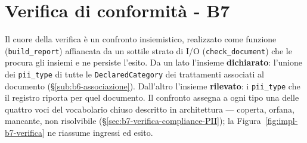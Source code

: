 \section{Verifica di conformità - B7}
\label{sec:impl-b7-conformita}

Il cuore della verifica è un confronto insiemistico, realizzato come funzione (\texttt{build\_report}) affiancata da un sottile strato di I/O (\texttt{check\_document}) che le procura gli insiemi e ne persiste l'esito. Da un lato l'insieme \textbf{dichiarato}: l'unione dei \texttt{pii\_type} di tutte le \texttt{DeclaredCategory} dei trattamenti associati al documento (§\ref{sub:b6-associazione}). Dall'altro l'insieme \textbf{rilevato}: i \texttt{pii\_type} che il registro riporta per quel documento. Il confronto assegna a ogni tipo una delle quattro voci del vocabolario chiuso descritto in architettura --- coperta, orfana, mancante, non risolvibile (§\ref{sec:b7-verifica-compliance-PII}); la Figura~\ref{fig:impl-b7-verifica} ne riassume ingressi ed esito.

